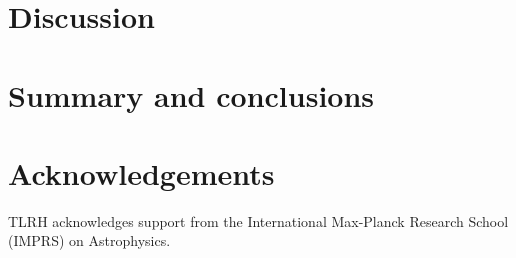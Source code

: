 \documentclass[a4paper,fleqn,usenatbib]{mnras}
\begin{document}
% 
% 
% 
% 






\section{Discussion}
\label{sec:discussion}


\section{Summary and conclusions}
\label{sec:conclusions}


\section*{Acknowledgements}
TLRH acknowledges support from the International Max-Planck Research School (IMPRS) on Astrophysics.
\end{document}
